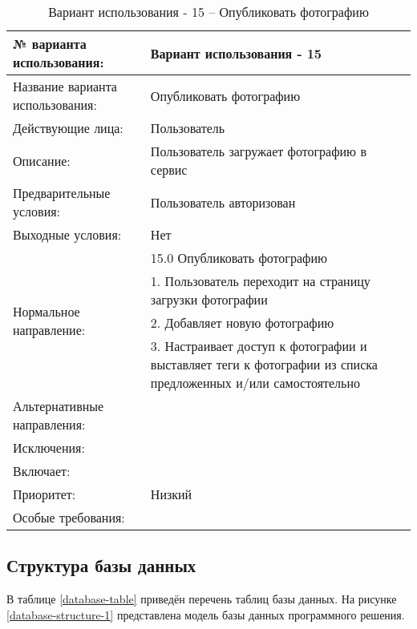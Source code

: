 \begin{table}[H]
  \caption{\onehalfspacing Вариант использования - 15 – Опубликовать фотографию}\label{use-case-15-table}
  \begin{tabular}{|p{6cm}|p{10cm}|}
  \hline № варианта использования: & Вариант использования - 15 \\
  \hline Название варианта использования: & Опубликовать фотографию \\
  \hline Действующие лица: & Пользователь \\
  \hline Описание: & Пользователь загружает фотографию в сервис \\
  \hline Предварительные условия: & Пользователь авторизован \\
  \hline Выходные условия: & Нет \\
  \hline \multirow{4}{*}{Нормальное направление:} & 15.0 Опубликовать фотографию \\
  \cline{2-2} & 1. Пользователь переходит на страницу загрузки фотографии \\
  \cline{2-2} & 2. Добавляет новую фотографию \\
  \cline{2-2} & 3. Настраивает доступ к фотографии и выставляет теги к фотографии из списка предложенных и/или самостоятельно \\
  \hline Альтернативные направления: &  \\
  \hline Исключения: &  \\
  \hline Включает: &  \\
  \hline Приоритет: & Низкий \\
  \hline Особые требования: & \\
  \hline
  \end{tabular}
\end{table}

\begin{landscape}
\end{landscape}

\subsection{Структура базы данных}
В таблице \ref{database-table} приведён перечень таблиц базы данных.
На рисунке \ref{database-structure-1} представлена модель базы данных программного решения.


